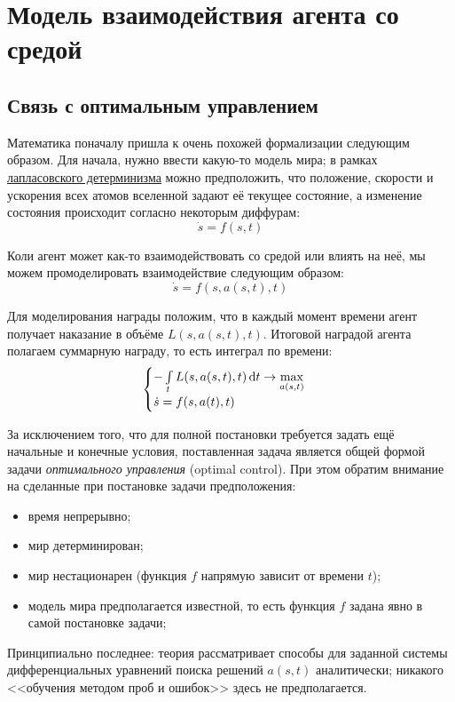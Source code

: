 \section{Модель взаимодействия агента со средой}

\subsection{Связь с оптимальным управлением}

Математика поначалу пришла к очень похожей формализации следующим образом. Для начала, нужно ввести какую-то модель мира; в рамках \href{https://ru.wikipedia.org/wiki/Демон_Лапласа}{лапласовского детерминизма} можно предположить, что положение, скорости и ускорения всех атомов вселенной задают её текущее состояние, а изменение состояния происходит согласно некоторым диффурам:
$$\dot{s} = f(s, t)$$

Коли агент может как-то взаимодействовать со средой или влиять на неё, мы можем промоделировать взаимодействие следующим образом:
$$\dot{s} = f(s, a(s, t), t)$$

Для моделирования награды положим, что в каждый момент времени агент получает наказание в объёме $L(s, a(s, t), t)$. Итоговой наградой агента полагаем суммарную награду, то есть интеграл по времени:
$$
\begin{cases}
-\int\limits_t L(s, a(s, t), t) \mathop{}\!\mathrm{d} t \to \max\limits_{a(s, t)} \\
\dot{s} = f(s, a(t), t)
\end{cases}
$$

За исключением того, что для полной постановки требуется задать ещё начальные и конечные условия, поставленная задача является общей формой задачи \emph{оптимального управления} (optimal control). При этом обратим внимание на сделанные при постановке задачи предположения:
\begin{itemize}
    \item время непрерывно;
    \item мир детерминирован;
    \item мир нестационарен (функция $f$ напрямую зависит от времени $t$);
    \item модель мира предполагается известной, то есть функция $f$ задана явно в самой постановке задачи;
\end{itemize}

Принципиально последнее: теория рассматривает способы для заданной системы дифференциальных уравнений поиска решений $a(s, t)$ аналитически; никакого <<обучения методом проб и ошибок>> здесь не предполагается.

